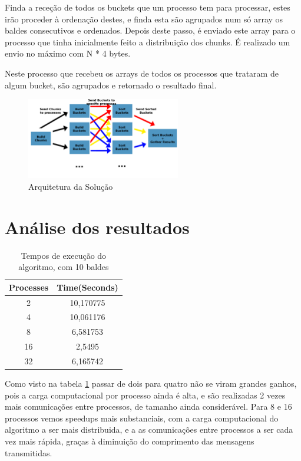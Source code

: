 \documentclass[a4paper]{report}
\begin{document}
Finda a receção de todos os buckets que um processo tem para processar, estes
irão proceder à ordenação destes, e finda esta são agrupados num só array os
baldes consecutivos e ordenados. Depois deste passo, é enviado este array para o
processo que tinha inicialmente feito a distribuição dos chunks. É realizado um
envio no máximo com N * 4 bytes.

Neste processo que recebeu os arrays de todos os processos que trataram de algum
bucket, são agrupados e retornado o resultado final.

\begin{figure}[h]
    \centering
    \includegraphics[width=0.6\textwidth]{images/esquemas/algoritmo_graph2.png}
    \caption{Arquitetura da Solução}
\end{figure}

\pagebreak
\section{Análise dos resultados}
\begin{table}[h]
    \centering
    \begin{tabular}{|c|c|}
        \hline
        Processes & Time(Seconds) \\ \hline
        2         & 10,170775     \\ \hline
        4         & 10,061176     \\ \hline
        8         & 6,581753      \\ \hline
        16        & 2,5495        \\ \hline
        32        & 6,165742      \\ \hline
    \end{tabular}
    \caption{\label{tab:Times}Tempos de execução do algoritmo, com 10 baldes}
\end{table}

Como visto na tabela \ref{tab:Times} passar de dois para quatro não 
se viram grandes ganhos, pois a carga computacional por processo ainda 
é alta, e são realizadas 2 vezes mais comunicações entre processos, 
de tamanho ainda considerável. Para 8 e 16 processos vemos speedups 
mais substanciais, com a carga computacional do algoritmo a ser 
mais distribuida, e a as comunicações entre processos a ser cada
vez mais rápida, graças à diminuição do comprimento das mensagens transmitidas.
\end{document}
